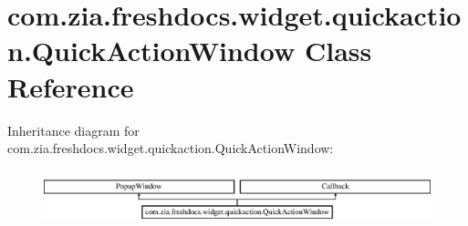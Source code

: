 \hypertarget{classcom_1_1zia_1_1freshdocs_1_1widget_1_1quickaction_1_1_quick_action_window}{\section{com.\-zia.\-freshdocs.\-widget.\-quickaction.\-Quick\-Action\-Window Class Reference}
\label{classcom_1_1zia_1_1freshdocs_1_1widget_1_1quickaction_1_1_quick_action_window}
}
Inheritance diagram for com.\-zia.\-freshdocs.\-widget.\-quickaction.\-Quick\-Action\-Window\-:\begin{figure}[H]
\begin{center}
\leavevmode
\includegraphics[height=1.613833cm]{classcom_1_1zia_1_1freshdocs_1_1widget_1_1quickaction_1_1_quick_action_window}
\end{center}
\end{figure}
